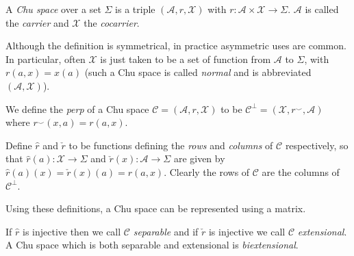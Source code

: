 \documentclass[12pt]{article}
\begin{document}
A \emph{Chu space} over a set $\Sigma$ is a triple $(\mathcal{A},r,\mathcal{X})$ with $r:\mathcal{A}\times\mathcal{X}\rightarrow\Sigma$.  $\mathcal{A}$ is called the \emph{carrier} and $\mathcal{X}$ the \emph{cocarrier}.

Although the definition is symmetrical, in practice asymmetric uses are common.  In particular, often $\mathcal{X}$ is just taken to be a set of function from $\mathcal{A}$ to $\Sigma$, with $r(a,x)=x(a)$ (such a Chu space is called \emph{normal} and is abbreviated $(\mathcal{A},\mathcal{X})$).

We define the \emph{perp} of a Chu space $\mathcal{C}=(\mathcal{A},r,\mathcal{X})$ to be $\mathcal{C}^\perp=(\mathcal{X},r^\smallsmile,\mathcal{A})$ where $r^\smallsmile(x,a)=r(a,x)$.

Define $\hat{r}$ and $\check{r}$ to be functions defining the \emph{rows} and \emph{columns} of $\mathcal{C}$ respectively, so that $\hat{r}(a):\mathcal{X}\rightarrow\Sigma$ and $\check{r}(x):\mathcal{A}\rightarrow\Sigma$ are given by $\hat{r}(a)(x)=\check{r}(x)(a)=r(a,x)$.  Clearly the rows of $\mathcal{C}$ are the columns of $\mathcal{C}^\perp$.

Using these definitions, a Chu space can be represented using a matrix.

If $\hat{r}$ is injective then we call $\mathcal{C}$ \emph{separable} and if $\check{r}$ is injective we call $\mathcal{C}$ \emph{extensional}.  A Chu space which is both separable and extensional is \emph{biextensional}.
\end{document}

